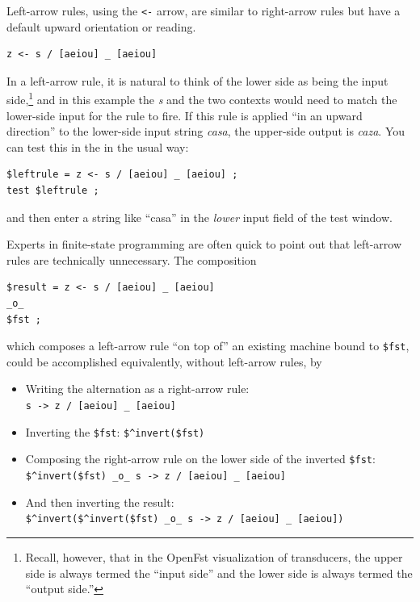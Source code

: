 Left-arrow rules, using the \texttt{<-} arrow, are similar to right-arrow
rules but have a default upward orientation or reading.

\begin{Verbatim}
z <- s / [aeiou] _ [aeiou]
\end{Verbatim}

\noindent
In a left-arrow rule, it is natural to think of the lower side as being the input side,\footnote{Recall,
however, that in the OpenFst visualization of transducers, the upper side is always termed the ``input
side'' and the lower side is always termed the ``output side.''} and in this example the
\emph{s} and
the two contexts would need to match the lower-side input for the rule to fire.  If this rule is
applied ``in an upward direction'' to the lower-side input string \emph{casa}, the upper-side output
is \emph{caza}.  You can test this in the  in the usual way:


\begin{Verbatim}
$leftrule = z <- s / [aeiou] _ [aeiou] ;
test $leftrule ;
\end{Verbatim}

\noindent
and then enter a string like ``casa'' in the \emph{lower} input field of the test window.


Experts in finite-state programming are often quick to point out that left-arrow rules
are technically unnecessary.  The composition

\begin{Verbatim}
$result = z <- s / [aeiou] _ [aeiou] 
_o_ 
$fst ;
\end{Verbatim}

\noindent
which composes a left-arrow rule ``on top of'' an existing machine bound to \verb!$fst!,
could be accomplished equivalently, without left-arrow rules, by 

\begin{itemize}
\item
Writing the alternation as a right-arrow rule:\\\verb!s -> z / [aeiou] _ [aeiou]!
\item
Inverting the \verb!$fst!:  \verb!$^invert($fst)!
\item
Composing the right-arrow rule on the lower side of the inverted \verb!$fst!:
\verb!$^invert($fst) _o_ s -> z / [aeiou] _ [aeiou]!
\item
And then inverting the result:\\ 
\verb!$^invert($^invert($fst) _o_ s -> z / [aeiou] _ [aeiou])!
\end{itemize}


